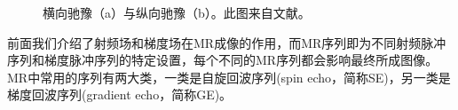 \begin{figure}[htbp]
\centering
{}
\centering
\caption{横向驰豫（a）与纵向驰豫（b）。此图来自文献\cite{haidekker2013medical}。}
\label{fig:t1t2}
\end{figure}

前面我们介绍了射频场和梯度场在MR成像的作用，而MR序列即为不同射频脉冲序列和梯度脉冲序列的特定设置，每个不同的MR序列都会影响最终所成图像。MR中常用的序列有两大类，一类是自旋回波序列(spin echo，简称SE)，另一类是梯度回波序列(gradient echo，简称GE)。


